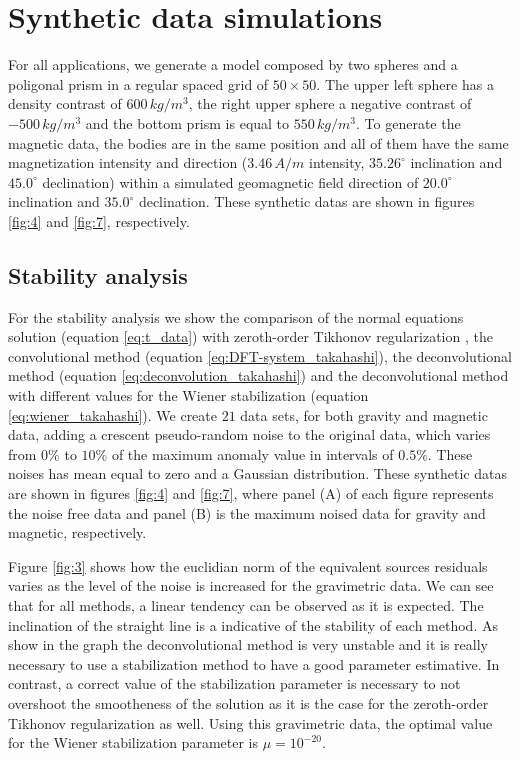 \section{Synthetic data simulations}
\label{sec:synthetic_simulations}

For all applications, we generate a model composed by two spheres and a poligonal prism in a regular spaced grid of $50 \times 50$. The upper left sphere has a density contrast of $600 \, kg/m^3$, the right upper sphere a negative contrast of $-500 \, kg/m^3$ and the bottom prism is equal to $550 \, kg/m^3$. To generate the magnetic data, the bodies are in the same position and all of them have the same magnetization intensity and direction ($3.46 \, A/m$ intensity, $35.26^{\circ}$ inclination and $45.0^{\circ}$ declination) within a simulated geomagnetic field direction of $20.0^{\circ}$ inclination and $35.0^{\circ}$ declination. These synthetic datas are shown in figures \ref{fig:4} and \ref{fig:7}, respectively.

\subsection{Stability analysis}

For the stability analysis we show the comparison of the normal equations solution (equation \ref{eq:t_data}) with zeroth-order Tikhonov regularization \citep{aster2018parameter}, the convolutional method (equation \ref{eq:DFT-system_takahashi}), the deconvolutional method (equation \ref{eq:deconvolution_takahashi}) and the deconvolutional method with different values for the Wiener stabilization (equation \ref{eq:wiener_takahashi}). We create $21$ data sets, for both gravity and magnetic data, adding a crescent pseudo-random noise to the original data, which varies from $0\%$ to $10\%$ of the maximum anomaly value in intervals of $0.5\%$. These noises has mean equal to zero and a Gaussian distribution. These synthetic datas are shown in figures \ref{fig:4} and \ref{fig:7}, where panel (A) of each figure represents the noise free data and panel (B) is the maximum noised data for gravity and magnetic, respectively.
		
Figure \ref{fig:3} shows how the euclidian norm of the equivalent sources residuals varies as the level of the noise is increased for the gravimetric data. We can see that for all methods, a linear tendency can be observed as it is expected. The inclination of the straight line is a indicative of the stability of each method. As show in the graph the deconvolutional method is very unstable and it is really necessary to use a stabilization method to have a good parameter estimative. In contrast, a correct value of the stabilization parameter is necessary to not overshoot the smootheness of the solution as it is the case for the zeroth-order Tikhonov regularization as well. Using this gravimetric data, the optimal value for the Wiener stabilization parameter is $\mu = 10^{-20}$. 

